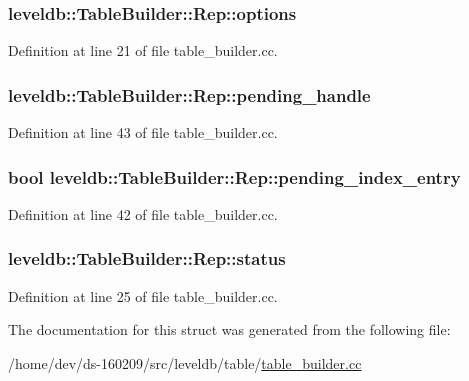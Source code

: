 \subsubsection[{options}]{ leveldb\+::\+Table\+Builder\+::\+Rep\+::options}\label{structleveldb_1_1_table_builder_1_1_rep_a0ca1914136ea4c451b026b4f1913fe36}


Definition at line 21 of file table\+\_\+builder.\+cc.

\hypertarget{structleveldb_1_1_table_builder_1_1_rep_abf3b47f6f2b7407399c7134ac65f7225}{}
\subsubsection[{pending\+\_\+handle}]{ leveldb\+::\+Table\+Builder\+::\+Rep\+::pending\+\_\+handle}\label{structleveldb_1_1_table_builder_1_1_rep_abf3b47f6f2b7407399c7134ac65f7225}


Definition at line 43 of file table\+\_\+builder.\+cc.

\hypertarget{structleveldb_1_1_table_builder_1_1_rep_a56e14221a2e29941a37d208f99770c20}{}
\subsubsection[{pending\+\_\+index\+\_\+entry}]{\setlength{\rightskip}{0pt plus 5cm}bool leveldb\+::\+Table\+Builder\+::\+Rep\+::pending\+\_\+index\+\_\+entry}\label{structleveldb_1_1_table_builder_1_1_rep_a56e14221a2e29941a37d208f99770c20}


Definition at line 42 of file table\+\_\+builder.\+cc.

\hypertarget{structleveldb_1_1_table_builder_1_1_rep_a8345f0a97587121457fb180a1fb081dd}{}
\subsubsection[{status}]{ leveldb\+::\+Table\+Builder\+::\+Rep\+::status}\label{structleveldb_1_1_table_builder_1_1_rep_a8345f0a97587121457fb180a1fb081dd}


Definition at line 25 of file table\+\_\+builder.\+cc.



The documentation for this struct was generated from the following file\+:\begin{DoxyCompactItemize}
\item 
/home/dev/ds-\/160209/src/leveldb/table/\hyperlink{table__builder_8cc}{table\+\_\+builder.\+cc}\end{DoxyCompactItemize}
